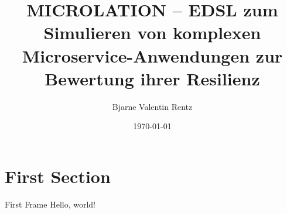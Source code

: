 \documentclass{beamer}
\title{MICROLATION -- EDSL zum Simulieren von komplexen
Microservice-Anwendungen zur Bewertung ihrer Resilienz}
\date{\today}
\author{Bjarne Valentin Rentz}
\institute{NORDAKADEMIE, Hamburg Port Authority}
\begin{document}
  \maketitle
  \section{First Section}
  \begin{frame}{First Frame}
    Hello, world!
  \end{frame}
\end{document}
